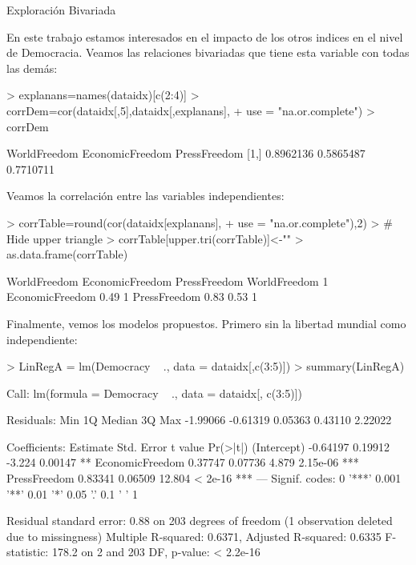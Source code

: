 \documentclass{article}
\begin{document}
Exploración Bivariada

En este trabajo estamos interesados en el impacto de los otros indices en el nivel de Democracia. Veamos las relaciones bivariadas que tiene esta variable con todas las demás:
\begin{Schunk}
\begin{Sinput}
> explanans=names(dataidx)[c(2:4)]
> corrDem=cor(dataidx[,5],dataidx[,explanans],
+     use = "na.or.complete")
> corrDem
\end{Sinput}
\begin{Soutput}
     WorldFreedom EconomicFreedom PressFreedom
[1,]    0.8962136       0.5865487    0.7710711
\end{Soutput}
\end{Schunk}




Veamos la correlación entre las variables independientes:

\begin{Schunk}
\begin{Sinput}
> corrTable=round(cor(dataidx[explanans],
+                use = "na.or.complete"),2)
> # Hide upper triangle
> corrTable[upper.tri(corrTable)]<-""
> as.data.frame(corrTable)
\end{Sinput}
\begin{Soutput}
                WorldFreedom EconomicFreedom PressFreedom
WorldFreedom               1                             
EconomicFreedom         0.49               1             
PressFreedom            0.83            0.53            1
\end{Soutput}
\end{Schunk}


Finalmente, vemos los modelos propuestos. Primero sin la libertad mundial como independiente:
\begin{Schunk}
\begin{Sinput}
> LinRegA = lm(Democracy ~ ., data = dataidx[,c(3:5)])
> summary(LinRegA)
\end{Sinput}
\begin{Soutput}
Call:
lm(formula = Democracy ~ ., data = dataidx[, c(3:5)])

Residuals:
     Min       1Q   Median       3Q      Max 
-1.99066 -0.61319  0.05363  0.43110  2.22022 

Coefficients:
                Estimate Std. Error t value Pr(>|t|)    
(Intercept)     -0.64197    0.19912  -3.224  0.00147 ** 
EconomicFreedom  0.37747    0.07736   4.879 2.15e-06 ***
PressFreedom     0.83341    0.06509  12.804  < 2e-16 ***
---
Signif. codes:  0 '***' 0.001 '**' 0.01 '*' 0.05 '.' 0.1 ' ' 1

Residual standard error: 0.88 on 203 degrees of freedom
  (1 observation deleted due to missingness)
Multiple R-squared:  0.6371,	Adjusted R-squared:  0.6335 
F-statistic: 178.2 on 2 and 203 DF,  p-value: < 2.2e-16
\end{Soutput}
\end{Schunk}
\end{document}
